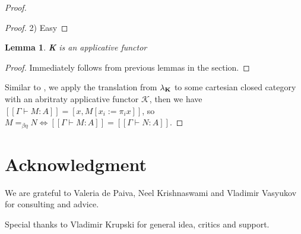 \documentclass[a4paper]{article}
\newtheorem{lemma}{Lemma}
\begin{document}
\begin{proof}
\begin{proof}
\vspace{\baselineskip}

2) Easy

\end{proof}

\begin{lemma}

  {\bf K} is an applicative functor
\end{lemma}

\begin{proof}
  Immediately follows from previous lemmas in the section.
\end{proof}

Similar to \cite{Abramsky}, we apply the translation from $\lambda_{{\bf K}}$ to some cartesian closed category with an abritraty applicative functor $\mathcal{K}$, then
we have $[\![\Gamma \vdash M : A]\!] = [x, M [x_i := \pi_i x]]$, so $M =_{\beta \eta} N \Leftrightarrow [\![\Gamma \vdash M : A]\!] = [\![\Gamma \vdash N : A]\!]$.

\end{proof}

\section{Acknowledgment}

  We are grateful to Valeria de Paiva, Neel Krishnaswami and Vladimir Vasyukov for consulting and advice.

  Special thanks to Vladimir Krupski for general idea, critics and support.

\end{document}
